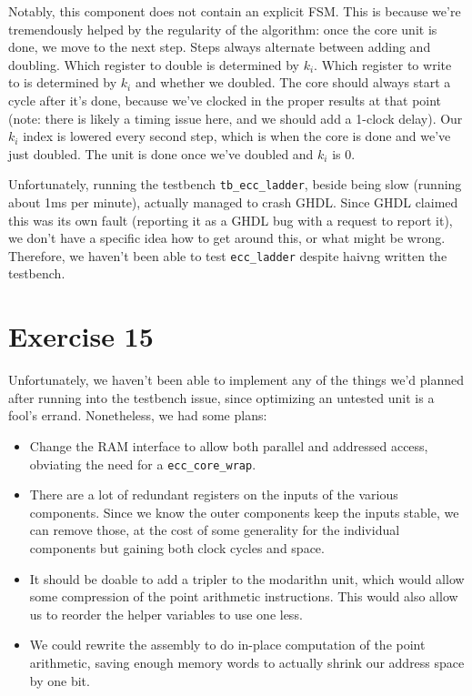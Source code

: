 \documentclass[a4paper,twoside]{article}
\newcommand{\atom}[1]{\mbox{\texttt{#1}}}
\begin{document}
Notably, this component does not contain an explicit FSM. This is because we're
tremendously helped by the regularity of the algorithm: once the core unit is
done, we move to the next step. Steps always alternate between adding and
doubling. Which register to double is determined by $k_i$. Which register to
write to is determined by $k_i$ and whether we doubled. The core should always
start a cycle after it's done, because we've clocked in the proper results at
that point (note: there is likely a timing issue here, and we should add a
1-clock delay). Our $k_i$ index is lowered every second step, which is when the
core is done and we've just doubled. The unit is done once we've doubled and
$k_i$ is 0.

Unfortunately, running the testbench \atom{tb\_ecc\_ladder}, beside being slow
(running about 1ms per minute), actually managed to crash GHDL. Since GHDL
claimed this was its own fault (reporting it as a GHDL bug with a request to
report it), we don't have a specific idea how to get around this, or what might
be wrong. Therefore, we haven't been able to test \atom{ecc\_ladder} despite
haivng written the testbench.

\section*{Exercise 15}
Unfortunately, we haven't been able to implement any of the things we'd planned
after running into the testbench issue, since optimizing an untested unit is a
fool's errand. Nonetheless, we had some plans:
\begin{itemize}
    \item Change the RAM interface to allow both parallel and addressed access,
        obviating the need for a \atom{ecc\_core\_wrap}.
    \item There are a lot of redundant registers on the inputs of the various
        components. Since we know the outer components keep the inputs stable,
        we can remove those, at the cost of some generality for the individual
        components but gaining both clock cycles and space.
    \item It should be doable to add a tripler to the modarithn unit, which
        would allow some compression of the point arithmetic instructions. This
        would also allow us to reorder the helper variables to use one less.
    \item We could rewrite the assembly to do in-place computation of the point
        arithmetic, saving enough memory words to actually shrink our address
        space by one bit.
\end{itemize}
\end{document}
